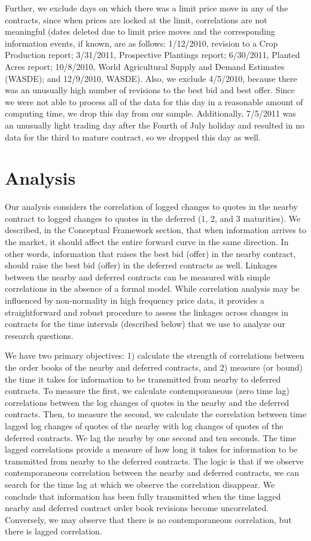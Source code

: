 \documentclass[]{elsarticle} %
\begin{document}
Further, we exclude days on which there was a limit price move in any of
the contracts, since when prices are locked at the limit, correlations
are not meaningful (dates deleted due to limit price moves and the
corresponding information events, if known, are as follows: 1/12/2010,
revision to a Crop Production report; 3/31/2011, Prospective Plantings
report; 6/30/2011, Planted Acres report; 10/8/2010, World Agricultural
Supply and Demand Estimates (WASDE); and 12/9/2010, WASDE). Also, we
exclude 4/5/2010, because there was an unusually high number of
revisions to the best bid and best offer. Since we were not able to
process all of the data for this day in a reasonable amount of computing
time, we drop this day from our sample. Additionally, 7/5/2011 was an
unusually light trading day after the Fourth of July holiday and
resulted in no data for the third to mature contract, so we dropped this
day as well.

\section{Analysis}\label{analysis}

Our analysis considers the correlation of logged changes to quotes in
the nearby contract to logged changes to quotes in the deferred (1, 2,
and 3 maturities). We described, in the Conceptual Framework section,
that when information arrives to the market, it should affect the entire
forward curve in the same direction. In other words, information that
raises the best bid (offer) in the nearby contract, should raise the
best bid (offer) in the deferred contracts as well. Linkages between the
nearby and deferred contracts can be measured with simple correlations
in the absence of a formal model. While correlation analysis may be
influenced by non-normality in high frequency price data, it provides a
straightforward and robust procedure to assess the linkages across
changes in contracts for the time intervals (described below) that we
use to analyze our research questions.

We have two primary objectives: 1) calculate the strength of
correlations between the order books of the nearby and deferred
contracts, and 2) measure (or bound) the time it takes for information
to be transmitted from nearby to deferred contracts. To measure the
first, we calculate contemporaneous (zero time lag) correlations between
the log changes of quotes in the nearby and the deferred contracts.
Then, to measure the second, we calculate the correlation between time
lagged log changes of quotes of the nearby with log changes of quotes of
the deferred contracts. We lag the nearby by one second and ten seconds.
The time lagged correlations provide a measure of how long it takes for
information to be transmitted from nearby to the deferred contracts. The
logic is that if we observe contemporaneous correlation between the
nearby and deferred contracts, we can search for the time lag at which
we observe the correlation disappear. We conclude that information has
been fully transmitted when the time lagged nearby and deferred contract
order book revisions become uncorrelated. Conversely, we may observe
that there is no contemporaneous correlation, but there is lagged
correlation.
\end{document}
